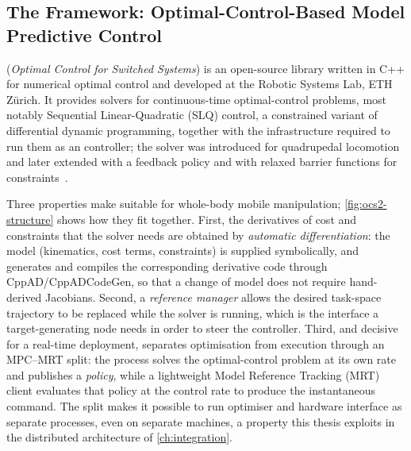 \subsection{The \ocs{} Framework: Optimal-Control-Based Model Predictive
  Control}
\label{sec:sota-ocs2}

\ocs{} (\emph{Optimal Control for Switched Systems}) is an open-source
library written in C++ for numerical optimal control and developed at
the Robotic Systems Lab, ETH Z\"urich. It provides solvers for
continuous-time optimal-control problems, most notably Sequential
Linear-Quadratic (SLQ) control, a constrained variant of differential
dynamic programming, together with the infrastructure required to run
them as an \mpc{} controller; the solver was introduced for quadrupedal
locomotion and later extended with a feedback policy and with relaxed
barrier functions for
constraints~\cite{Farshidian2017SLQ,Grandia2019FeedbackMPC,%
Feller2017RelaxedBarrier,ocs2Toolbox}.

Three properties make \ocs{} suitable for whole-body mobile
manipulation; \cref{fig:ocs2-structure} shows how they fit together.
First, the derivatives of cost and constraints that the solver needs are
obtained by \emph{automatic differentiation}: the model (kinematics,
cost terms, constraints) is supplied symbolically, and \ocs{} generates
and compiles the corresponding derivative code through
CppAD/CppADCodeGen, so that a change of model does not require hand-derived
Jacobians. Second, a \emph{reference manager} allows the desired
task-space trajectory to be replaced while the solver is running, which
is the interface a target-generating node needs in order to steer the
controller. Third, and decisive for a real-time deployment, \ocs{}
separates optimisation from execution through an MPC--MRT split: the
\mpc{} process solves the optimal-control problem at its own rate and
publishes a \emph{policy}, while a lightweight Model Reference Tracking
(MRT) client evaluates that policy at the control rate to produce the
instantaneous command. The split makes it possible to run optimiser and
hardware interface as separate processes, even on separate machines, a
property this thesis exploits in the distributed architecture of
\cref{ch:integration}.

